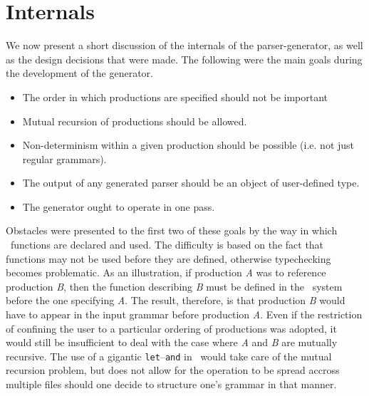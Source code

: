 \section{Internals}\label{Internals}

  We now present a short discussion of the internals of the parser-generator,
  as well as the design decisions that were made.  The following were the main
  goals during the development of the generator.
  \begin{itemize}
  \item The order in which productions are specified should not be important
  \item Mutual recursion of productions should be allowed.
  \item Non-determinism within a given production should be possible
        (i.e. not just regular grammars).
  \item The output of any generated parser should be an object of
        user-defined type.
  \item The generator ought to operate in one pass.
  \end{itemize}

  Obstacles were presented to the first two of these goals by the way
  in which \ML\ functions are declared and used.  The difficulty is based on
  the fact that functions may
  not be used before they are defined, otherwise typechecking becomes
  problematic.  As an illustration, if production {\it A} was to 
  reference production {\it B},
  then the function describing {\it B} must be defined in the \ML\ system
  before the one specifying {\it A}.  The result, therefore, is
  that production {\it B} would have to appear in the input
  grammar before production {\it A}.  Even if the restriction of confining the
  user to a particular ordering of productions was adopted, it would
  still be insufficient to deal with the case where {\it A} and {\it B} are
  mutually recursive.  The use of a gigantic {\tt let}--{\tt and} in \ML\
  would take care of the mutual recursion problem, but does not allow for
  the operation to be spread accross multiple files should one decide
  to structure one's grammar in that manner.

